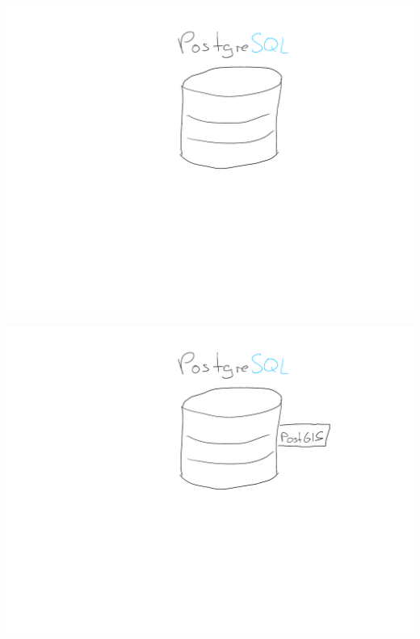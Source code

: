 \documentclass{beamer}
\begin{document}
	\begin{frame}
		\begin{center}
			\includegraphics[width=\linewidth]{images/database-2}
		\end{center}
	\end{frame}

	\begin{frame}
		\begin{center}
			\includegraphics[width=\linewidth]{images/database-3}
		\end{center}
	\end{frame}
\end{document}
